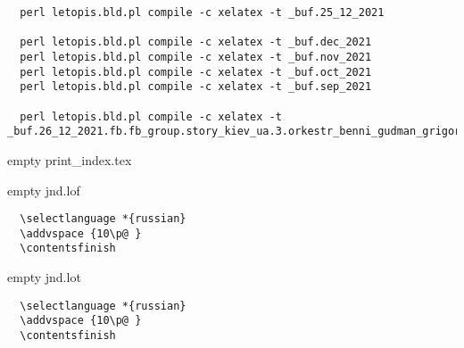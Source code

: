  
 
 
 
 

\begin{verbatim}
  perl letopis.bld.pl compile -c xelatex -t _buf.25_12_2021

  perl letopis.bld.pl compile -c xelatex -t _buf.dec_2021
  perl letopis.bld.pl compile -c xelatex -t _buf.nov_2021
  perl letopis.bld.pl compile -c xelatex -t _buf.oct_2021
  perl letopis.bld.pl compile -c xelatex -t _buf.sep_2021

  perl letopis.bld.pl compile -c xelatex -t _buf.26_12_2021.fb.fb_group.story_kiev_ua.3.orkestr_benni_gudman_grigorij_chapkis_1962

\end{verbatim}

empty print_index.tex

empty jnd.lof

\begin{verbatim}
  \selectlanguage *{russian}
  \addvspace {10\p@ }
  \contentsfinish
\end{verbatim}

empty jnd.lot

\begin{verbatim}
  \selectlanguage *{russian}
  \addvspace {10\p@ }
  \contentsfinish
\end{verbatim}
